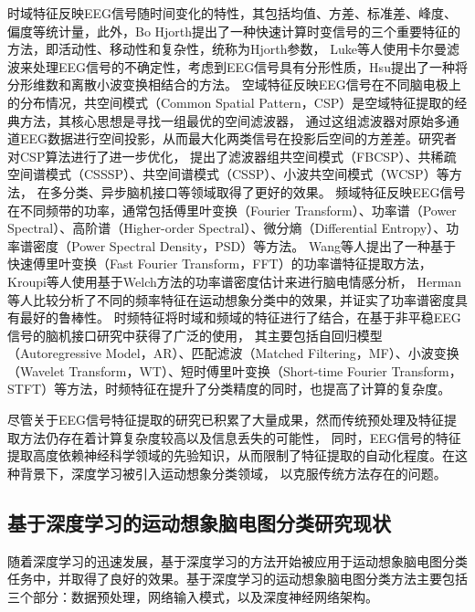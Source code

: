 时域特征反映EEG信号随时间变化的特性，其包括均值、方差、标准差、峰度、偏度等统计量，此外，Bo Hjorth提出了一种快速计算时变信号的三个重要特征的方法，即活动性、移动性和复杂性，统称为Hjorth参数\cite{HJORTH1970306}，
Luke等人使用卡尔曼滤波来处理EEG信号的不确定性\cite{7448410}，考虑到EEG信号具有分形性质，Hsu提出了一种将分形维数和离散小波变换相结合的方法\cite{HSU2010295}。
空域特征反映EEG信号在不同脑电极上的分布情况，共空间模式（Common Spatial Pattern，CSP）是空域特征提取的经典方法，其核心思想是寻找一组最优的空间滤波器，
通过这组滤波器对原始多通道EEG数据进行空间投影，从而最大化两类信号在投影后空间的方差差\cite{wang2006common}。研究者对CSP算法进行了进一步优化，
提出了滤波器组共空间模式（FBCSP）\cite{ang2008filter}、共稀疏空间谱模式（CSSSP）\cite{dornhege2006combined}、共空间谱模式（CSSP）\cite{lemm2005spatio}、小波共空间模式（WCSP）\cite{mousavi2011wavelet}等方法，
在多分类、异步脑机接口等领域取得了更好的效果。
频域特征反映EEG信号在不同频带的功率，通常包括傅里叶变换（Fourier Transform）、功率谱（Power Spectral）、高阶谱（Higher-order Spectral）、微分熵（Differential Entropy）、功率谱密度（Power Spectral Density，PSD）等方法。
Wang等人提出了一种基于快速傅里叶变换（Fast Fourier Transform，FFT）的功率谱特征提取方法\cite{wang2017tinnitus}，Kroupi等人使用基于Welch方法的功率谱密度估计来进行脑电情感分析\cite{kroupi2011eeg}，
Herman等人比较分析了不同的频率特征在运动想象分类中的效果，并证实了功率谱密度具有最好的鲁棒性\cite{herman2008comparative}。
时频特征将时域和频域的特征进行了结合，在基于非平稳EEG信号的脑机接口研究中获得了广泛的使用\cite{pawar2020feature}，
其主要包括自回归模型（Autoregressive Model，AR）、匹配滤波（Matched Filtering，MF）、小波变换（Wavelet Transform，WT）、短时傅里叶变换（Short-time Fourier Transform，STFT）等方法，时频特征在提升了分类精度的同时，也提高了计算的复杂度。

尽管关于EEG信号特征提取的研究已积累了大量成果，然而传统预处理及特征提取方法仍存在着计算复杂度较高以及信息丢失的可能性，
同时，EEG信号的特征提取高度依赖神经科学领域的先验知识，从而限制了特征提取的自动化程度\cite{altaheri2023deep}。在这种背景下，深度学习被引入运动想象分类领域，
以克服传统方法存在的问题。

\subsection{基于深度学习的运动想象脑电图分类研究现状}

随着深度学习的迅速发展，基于深度学习的方法开始被应用于运动想象脑电图分类任务中，并取得了良好的效果。基于深度学习的运动想象脑电图分类方法主要包括三个部分：数据预处理，网络输入模式，以及深度神经网络架构。


